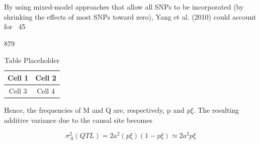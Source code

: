 \documentclass{article}
\begin{document}
By using mixed-model approaches that allow all SNPs to be incorporated (by shrinking the effects of most SNPs toward zero), Yang et al. (2010) could account for ~45%

879

\begin{table}[h]
\centering
\begin{tabular}{|c|c|}
\hline
Cell 1 & Cell 2 \\
\hline
Cell 3 & Cell 4 \\
\hline
\end{tabular}
\caption{Table Placeholder}
\end{table}

Hence, the frequencies of M and Q are, respectively, p and  $ p\xi $. The resulting additive variance due to the causal site becomes

\begin{equation}
\sigma_{A}^{2}(Q T L)=2a^{2}(p\xi)(1-p\xi)\simeq2a^{2}p\xi
\end{equation}
\end{document}
